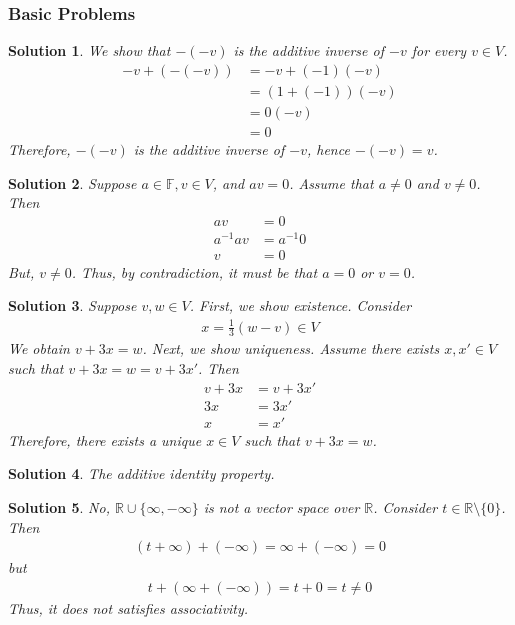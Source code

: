 \documentclass[12pt]{article}
\newcommand{\R}{\mathbb{R}}
\newcommand{\F}{\mathbb{F}}
\theoremstyle{problem}
\newtheorem{sol}{Solution}
\theoremstyle{remark}
\begin{document}
\subsubsection{Basic Problems}
\begin{sol}
    We show that $-(-v)$ is the additive inverse of $-v$ for every $v \in V$.
    \begin{align*}
        -v + (-(-v)) &= -v + (-1)(-v)\\
        &= (1 + (-1))(-v)  \\
        &= 0(-v)  \\
        &= 0
    \end{align*}
    Therefore, $-(-v)$ is the additive inverse of $-v$, hence $-(-v) = v$. 
\end{sol}
\begin{sol}
    Suppose $a \in \F, v \in V$, and $av =0$. Assume that $a \neq 0$ and $v \neq 0$. Then
    \begin{align*}
        av &= 0 \\
        a^{-1}av &= a^{-1}0 \\
        v &=  0
    \end{align*}
    But, $v \neq 0$. Thus, by contradiction, it must be that $a = 0$ or $v = 0$.
\end{sol}
\begin{sol}
    Suppose $v,w \in V$. First, we show existence. Consider
    \begin{align*}
        x = \frac{1}{3}\left(w-v\right) \in V
    \end{align*}
    We obtain $v +3x = w$. Next, we show uniqueness. Assume there exists $x,x' \in V$ such that $v + 3x = w =v +3x'$. Then
    \begin{align*}
        v + 3x &= v + 3x' \\
        3x &= 3x' \\
        x &= x'
    \end{align*}
    Therefore, there exists a unique $x \in V$ such that $v  + 3x = w$.
\end{sol}
\begin{sol}
    The additive identity property.
\end{sol}
\begin{sol}
    No, $\R \cup \{\infty, -\infty\}$ is not a vector space over $\R$. Consider $t \in \R\setminus\{0\}$. Then 
    \begin{align*}
        (t + \infty) + (-\infty) = \infty + (-\infty) = 0
    \end{align*}
    but
    \begin{align*}
        t + (\infty + (-\infty)) = t + 0 = t \neq 0
    \end{align*}
    Thus, it does not satisfies associativity.
\end{sol}
\end{document}
